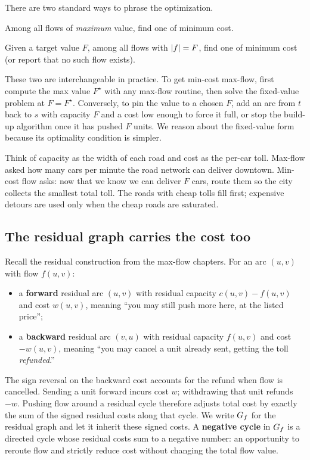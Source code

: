 There are two standard ways to phrase the optimization.

\begin{definition}\label{ch14:def-mcmf}
Among all flows of \emph{maximum} value, find one of minimum cost.
\end{definition}

\begin{definition}\label{ch14:def-fixedval}
Given a target value $F$, among all flows with $\lvert f\rvert=F$, find one of minimum cost (or report that no such flow exists).
\end{definition}

These two are interchangeable in practice. To get min-cost max-flow, first compute the max value $F^\star$ with any max-flow routine, then solve the fixed-value problem at $F=F^\star$. Conversely, to pin the value to a chosen $F$, add an arc from $t$ back to $s$ with capacity $F$ and a cost low enough to force it full, or stop the build-up algorithm once it has pushed $F$ units. We reason about the fixed-value form because its optimality condition is simpler.

\begin{intuitionbox}
Think of capacity as the width of each road and cost as the per-car toll. Max-flow asked how many cars per minute the road network can deliver downtown. Min-cost flow asks: now that we know we can deliver $F$ cars, route them so the city collects the smallest total toll. The roads with cheap tolls fill first; expensive detours are used only when the cheap roads are saturated.
\end{intuitionbox}

\subsection{The residual graph carries the cost too}

Recall the residual construction from the max-flow chapters. For an arc $(u,v)$ with flow $f(u,v)$:
\begin{itemize}
  \item a \textbf{forward} residual arc $(u,v)$ with residual capacity $c(u,v)-f(u,v)$ and cost $w(u,v)$, meaning ``you may still push more here, at the listed price'';
  \item a \textbf{backward} residual arc $(v,u)$ with residual capacity $f(u,v)$ and cost $-w(u,v)$, meaning ``you may cancel a unit already sent, getting the toll \emph{refunded}.''
\end{itemize}
The sign reversal on the backward cost accounts for the refund when flow is cancelled. Sending a unit forward incurs cost $w$; withdrawing that unit refunds $-w$. Pushing flow around a residual cycle therefore adjusts total cost by exactly the sum of the signed residual costs along that cycle. We write $G_f$ for the residual graph and let it inherit these signed costs. A \textbf{negative cycle} in $G_f$ is a directed cycle whose residual costs sum to a negative number: an opportunity to reroute flow and strictly reduce cost without changing the total flow value.

